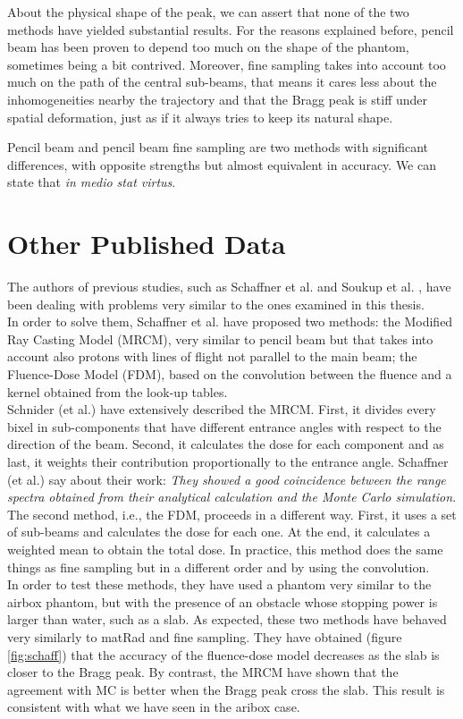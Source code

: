 \documentclass[12pt, a4paper, twoside]{book}
\begin{document}
About the physical shape of the peak, we can assert that none of the two methods have yielded substantial results. For the reasons explained before, pencil beam has been proven to depend too much on the shape of the phantom, sometimes being a bit contrived. Moreover, fine sampling takes into account too much on the path of the central sub-beams, that means it cares less about the inhomogeneities nearby the trajectory and that the Bragg peak is stiff under spatial deformation, just as if it always tries to keep its natural shape.

Pencil beam and pencil beam fine sampling are two methods with significant differences, with opposite strengths but almost equivalent in accuracy. We can state that \emph{in medio stat virtus}.


\section{Other Published Data}

The authors of previous studies, such as Schaffner et al. \cite{schaf:pba} and Soukup et al. \cite{souk:pba}, have been dealing with problems very similar to the ones examined in this thesis.\\
In order to solve them, Schaffner et al. \cite{schaf:pba} have proposed two methods: the Modified Ray Casting Model (MRCM), very similar to pencil beam but that takes into account also protons with lines of flight not parallel to the main beam; the Fluence-Dose Model (FDM), based on the convolution between the fluence and a kernel obtained from the look-up tables.\\
Schnider (et al.) \cite{schn:pba} have extensively described the MRCM. First, it divides every bixel in sub-components that have different entrance angles with respect to the direction of the beam. Second, it calculates the dose for each component and as last, it weights their contribution proportionally to the entrance angle. Schaffner (et al.) say about their work: \emph{They showed a good coincidence between the range spectra obtained from their analytical calculation and the Monte Carlo simulation}.\\
The second method, i.e., the FDM, proceeds in a different way. First, it uses a set of sub-beams and calculates the dose for each one. At the end, it calculates a weighted mean to obtain the total dose. In practice, this method does the same things as fine sampling but in a different order and by using the convolution.\\
In order to test these methods, they have used a phantom very similar to the airbox phantom, but with the presence of an obstacle whose stopping power is larger than water, such as a slab. As expected, these two methods have behaved very similarly to matRad and fine sampling. They have obtained (figure \ref{fig:schaff}) that the accuracy of the fluence-dose model decreases as the slab is closer to the Bragg peak. By contrast, the MRCM have shown that the agreement with MC is better when the Bragg peak cross the slab. This result is consistent with what we have seen in the aribox case.\\
\end{document}

